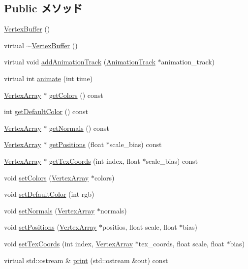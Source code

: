 \subsection*{Public メソッド}
\begin{CompactItemize}
\item 
\hyperlink{classm3g_1_1VertexBuffer_fd7b13840c99c57d27316c8f8434dc49}{VertexBuffer} ()
\item 
virtual \hyperlink{classm3g_1_1VertexBuffer_0e5e1dbdc4295ff9aa1e15e0ce3624af}{$\sim$VertexBuffer} ()
\item 
virtual void \hyperlink{classm3g_1_1VertexBuffer_415c0b110f95410ded9b85e5d99a496b}{addAnimationTrack} (\hyperlink{classm3g_1_1AnimationTrack}{AnimationTrack} $\ast$animation\_\-track)
\item 
virtual int \hyperlink{classm3g_1_1VertexBuffer_82cfeb67ca66b93e2ca7bda9a4f0e2aa}{animate} (int time)
\item 
\hyperlink{classm3g_1_1VertexArray}{VertexArray} $\ast$ \hyperlink{classm3g_1_1VertexBuffer_e3bdc8503242a6d278230352d03e5893}{getColors} () const 
\item 
int \hyperlink{classm3g_1_1VertexBuffer_4e33b93a98ce0632d51e7ae775ae5b1e}{getDefaultColor} () const 
\item 
\hyperlink{classm3g_1_1VertexArray}{VertexArray} $\ast$ \hyperlink{classm3g_1_1VertexBuffer_0f4341d1215ff8f4efeaa40a21327c0c}{getNormals} () const 
\item 
\hyperlink{classm3g_1_1VertexArray}{VertexArray} $\ast$ \hyperlink{classm3g_1_1VertexBuffer_5ca059361f9f834dd00b5d595bf3df0b}{getPositions} (float $\ast$scale\_\-bias) const 
\item 
\hyperlink{classm3g_1_1VertexArray}{VertexArray} $\ast$ \hyperlink{classm3g_1_1VertexBuffer_9015840c09da0691c31a8aab5e09404a}{getTexCoords} (int index, float $\ast$scale\_\-bias) const 
\item 
void \hyperlink{classm3g_1_1VertexBuffer_e5a5933252e3ec3afa0a83698b5b3521}{setColors} (\hyperlink{classm3g_1_1VertexArray}{VertexArray} $\ast$colors)
\item 
void \hyperlink{classm3g_1_1VertexBuffer_ba88996ea63221b09b9f841aef0270ee}{setDefaultColor} (int rgb)
\item 
void \hyperlink{classm3g_1_1VertexBuffer_4aabe6277538d5aa8285759dab85002a}{setNormals} (\hyperlink{classm3g_1_1VertexArray}{VertexArray} $\ast$normals)
\item 
void \hyperlink{classm3g_1_1VertexBuffer_527460407f488d5128bae7d0adb6da43}{setPositions} (\hyperlink{classm3g_1_1VertexArray}{VertexArray} $\ast$positios, float scale, float $\ast$bias)
\item 
void \hyperlink{classm3g_1_1VertexBuffer_9fd3dd3f78138d654d18863e4f1329f4}{setTexCoords} (int index, \hyperlink{classm3g_1_1VertexArray}{VertexArray} $\ast$tex\_\-coords, float scale, float $\ast$bias)
\item 
virtual std::ostream \& \hyperlink{classm3g_1_1VertexBuffer_6fea17fa1532df3794f8cb39cb4f911f}{print} (std::ostream \&out) const 
\end{CompactItemize}

